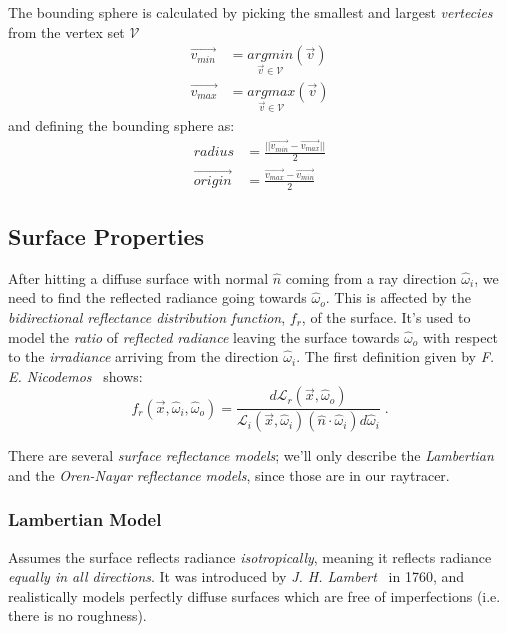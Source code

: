 \documentclass[a4paper, twocolumn]{article}
\begin{document}
    The bounding sphere is calculated by picking the smallest and largest \textit{vertecies} from the vertex set \(\mathcal{V}\)
    \begin{align*} 
        \vec{v_{min}} &= \underset{\vec{v} \in \mathcal{V}}{argmin}(\vec{v}) \\
        \vec{v_{max}} &= \underset{\vec{v} \in \mathcal{V}}{argmax}(\vec{v})
    \end{align*}
    and defining the bounding sphere as:
    \begin{align*}
        radius &= \frac{ || \vec{v_{min}} - \vec{v_{max}} ||}{2} \\
        \vec{origin} &= \frac{\vec{v_{max}} - \vec{v_{min}}}{2}
    \end{align*}

    \clearpage

        \subsection{Surface Properties} \label{sec:surface_properties}

            After hitting a diffuse surface with normal \(\hat{n}\) coming from a ray direction \(\hat{\omega}_i\), we need to find the reflected radiance going towards \(\hat{\omega}_o\). This is affected by the \emph{bidirectional reflectance distribution function}, \(f_r\), of the surface. It's used to model the \emph{ratio} of \emph{reflected radiance} leaving the surface towards \(\hat{\omega}_o\) with respect to the \emph{irradiance} arriving from the direction \(\hat{\omega}_i\). The first definition given by \emph{F. E. Nicodemos}~\cite{nicodemus1965directional} shows: \[f_r(\vec{x}, \hat{\omega}_i, \hat{\omega}_o) = \frac{d \mathcal{L}_{r}(\vec{x}, \hat{\omega}_o)}{\mathcal{L}_i(\vec{x}, \hat{\omega}_i)(\hat{n} \cdot \hat{\omega}_i)d\hat{\omega}_i}\; .\]

            There are several \emph{surface reflectance models}; we'll only describe the \emph{Lambertian} and the \emph{Oren-Nayar} \emph{reflectance models}, since those are in our raytracer.

            \subsubsection{Lambertian Model} \label{sec:lambertian_model}

                Assumes the surface reflects radiance \emph{isotropically}, meaning it reflects radiance \emph{equally in all directions}. It was introduced by \emph{J. H. Lambert}~\cite{lambert1760photometria} in 1760, and realistically models perfectly diffuse surfaces which are free of imperfections (i.e. there is no roughness).
\end{document}
